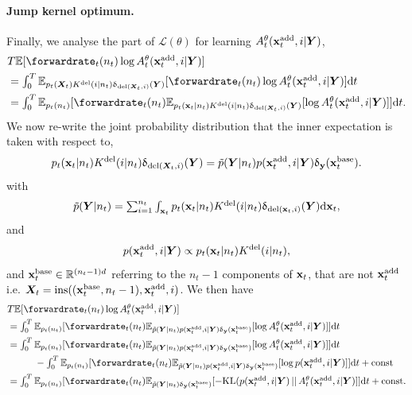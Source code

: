 \paragraph{Jump kernel optimum.} Finally, we analyse the part of
$\mathcal{L}(\theta)$ for learning $A_t^\theta({\mathbf{x}}^{\textup{add}}_t, i | {\bm{Y}})$,
\begin{align}
    &\textstyle T \mathbb{E} [ \forwardrate_t(n_t) \log \autonet_t^\theta(\xadd_t, i | \mY) ]\\
    &\textstyle = \int_{0}^T \mathbb{E}_{p_t(\mX_t) \delidxdist(i | n_t) \updelta_{\text{del}(\mX_t, i)}(\mY)} [ \forwardrate_t(n_t) \log \autonet_t^\theta(\xadd_t, i | \mY) ] \rmd t\\
    &\textstyle = \int_{0}^T \mathbb{E}_{p_t(n_t)} [ \forwardrate_t(n_t) \mathbb{E}_{p_t(\rvx_t | n_t) \delidxdist(i | n_t) \updelta_{\text{del}(\mX_t, i)}(\mY)} [ \log \autonet_t^\theta(\xadd_t, i | \mY) ] ] \rmd t.
\end{align}
We now re-write the joint probability distribution that the inner expectation is taken with respect to,
\begin{equation}
    p_t({\mathbf{x}}_t | n_t) K^{\textup{del}}(i | n_t) \updelta_{\text{del}({\bm{X}}_t, i)}({\bm{Y}}) = \tilde{p}({\bm{Y}} | n_t) p({\mathbf{x}}^{\textup{add}}_t, i | {\bm{Y}}) \updelta_{\mathbf{y}}({\mathbf{x}}_t^{\text{base}}) . 
\end{equation}
with 
\begin{equation}
  \textstyle 
    \tilde{p}({\bm{Y}} | n_t) = \sum_{i=1}^{n_t} \int_{{\mathbf{x}}_t} p_t({\mathbf{x}}_t | n_t) K^{\textup{del}}(i | n_t) \updelta_{\text{del}({\mathbf{x}}_t, i)}({\bm{Y}}) \mathrm{d} {\mathbf{x}}_t,
  \end{equation}
  and
\begin{equation}
    p({\mathbf{x}}^{\textup{add}}_t, i | {\bm{Y}}) \propto p_t({\mathbf{x}}_t | n_t) K^{\textup{del}}(i | n_t) , 
\end{equation}
and ${\mathbf{x}}_t^{\text{base}} \in \mathbb{R}^{(n_t-1)d}$ referring to the $n_t - 1$ components of ${\mathbf{x}}_t$, that are not ${\mathbf{x}}_t^{\text{add}}$ i.e. ${\bm{X}}_t = \text{ins}(({\mathbf{x}}_t^{\text{base}}, n_t - 1), {\mathbf{x}}^{\textup{add}}_t, i)$.
We then have
\begin{align}
    &\textstyle T \mathbb{E} [ \forwardrate_t(n_t) \log \autonet_t^\theta(\xadd_t, i | \mY) ]\\
    &\textstyle = \int_{0}^T \mathbb{E}_{p_t(n_t)} [ \forwardrate_t(n_t) \mathbb{E}_{\tilde{p}(\mY | n_t) p(\xadd_t, i | \mY) \updelta_{\y}(\rvx_t^{\text{base}})} [ \log \autonet_t^\theta(\xadd_t, i | \mY) ] ] \rmd t\\
    &\textstyle = \int_{0}^T \mathbb{E}_{p_t(n_t)} [ \forwardrate_t(n_t) \mathbb{E}_{\tilde{p}(\mY | n_t) p(\xadd_t, i | \mY) \updelta_{\y}(\rvx_t^{\text{base}})} [ \log \autonet_t^\theta(\xadd_t, i | \mY) ] ] \rmd t \\
    &\textstyle  \hspace{1cm} - \int_{0}^T \mathbb{E}_{p_t(n_t)} [ \forwardrate_t(n_t) \mathbb{E}_{\tilde{p}(\mY | n_t) p(\xadd_t, i | \mY) \updelta_{\y}(\rvx_t^{\text{base}})} [ \log p(\xadd_t, i | \mY) ] ] \rmd t + \text{const}\\
    &\textstyle = \int_{0}^T \mathbb{E}_{p_t(n_t)} [ \forwardrate_t(n_t) \mathbb{E}_{\tilde{p}(\mY | n_t) \updelta_{\y}(\rvx_t^{\text{base}}) } [ - \text{KL}(p(\xadd_t, i | \mY) \, || \, A_t^\theta(\xadd_t, i | \mY) ] ] \rmd t + \text{const} .
\end{align}

